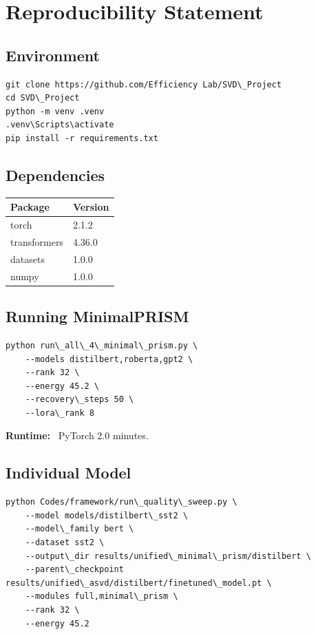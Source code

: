 
\section{Reproducibility Statement}

\subsection{Environment}

\begin{lstlisting}
git clone https://github.com/Efficiency Lab/SVD\_Project
cd SVD\_Project
python -m venv .venv
.venv\Scripts\activate
pip install -r requirements.txt
\end{lstlisting}

\subsection{Dependencies}

\begin{table}[H]
\centering
\small
\begin{tabular}{ll}
\toprule
\textbf{Package} & \textbf{Version} \\
\midrule
torch & 2.1.2 \\
transformers & 4.36.0 \\
datasets & 1.0.0 \\
numpy & 1.0.0 \\
\bottomrule
\end{tabular}
\end{table}

\subsection{Running MinimalPRISM}

\begin{lstlisting}
python run\_all\_4\_minimal\_prism.py \
    --models distilbert,roberta,gpt2 \
    --rank 32 \
    --energy 45.2 \
    --recovery\_steps 50 \
    --lora\_rank 8
\end{lstlisting}

\textbf{Runtime:} ~PyTorch 2.0 minutes.

\subsection{Individual Model}

\begin{lstlisting}
python Codes/framework/run\_quality\_sweep.py \
    --model models/distilbert\_sst2 \
    --model\_family bert \
    --dataset sst2 \
    --output\_dir results/unified\_minimal\_prism/distilbert \
    --parent\_checkpoint results/unified\_asvd/distilbert/finetuned\_model.pt \
    --modules full,minimal\_prism \
    --rank 32 \
    --energy 45.2
\end{lstlisting}

